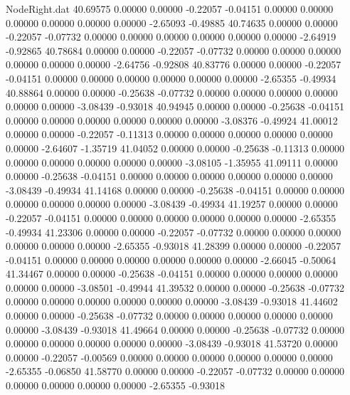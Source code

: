 \begin{filecontents}{NodeRight.dat}
  40.69575    0.00000    0.00000    -0.22057   -0.04151    0.00000    0.00000    0.00000    0.00000    0.00000    0.00000   -2.65093   -0.49885
  40.74635    0.00000    0.00000    -0.22057   -0.07732    0.00000    0.00000    0.00000    0.00000    0.00000    0.00000   -2.64919   -0.92865
  40.78684    0.00000    0.00000    -0.22057   -0.07732    0.00000    0.00000    0.00000    0.00000    0.00000    0.00000   -2.64756   -0.92808
  40.83776    0.00000    0.00000    -0.22057   -0.04151    0.00000    0.00000    0.00000    0.00000    0.00000    0.00000   -2.65355   -0.49934
  40.88864    0.00000    0.00000    -0.25638   -0.07732    0.00000    0.00000    0.00000    0.00000    0.00000    0.00000   -3.08439   -0.93018
  40.94945    0.00000    0.00000    -0.25638   -0.04151    0.00000    0.00000    0.00000    0.00000    0.00000    0.00000   -3.08376   -0.49924
  41.00012    0.00000    0.00000    -0.22057   -0.11313    0.00000    0.00000    0.00000    0.00000    0.00000    0.00000   -2.64607   -1.35719
  41.04052    0.00000    0.00000    -0.25638   -0.11313    0.00000    0.00000    0.00000    0.00000    0.00000    0.00000   -3.08105   -1.35955
  41.09111    0.00000    0.00000    -0.25638   -0.04151    0.00000    0.00000    0.00000    0.00000    0.00000    0.00000   -3.08439   -0.49934
  41.14168    0.00000    0.00000    -0.25638   -0.04151    0.00000    0.00000    0.00000    0.00000    0.00000    0.00000   -3.08439   -0.49934
  41.19257    0.00000    0.00000    -0.22057   -0.04151    0.00000    0.00000    0.00000    0.00000    0.00000    0.00000   -2.65355   -0.49934
  41.23306    0.00000    0.00000    -0.22057   -0.07732    0.00000    0.00000    0.00000    0.00000    0.00000    0.00000   -2.65355   -0.93018
  41.28399    0.00000    0.00000    -0.22057   -0.04151    0.00000    0.00000    0.00000    0.00000    0.00000    0.00000   -2.66045   -0.50064
  41.34467    0.00000    0.00000    -0.25638   -0.04151    0.00000    0.00000    0.00000    0.00000    0.00000    0.00000   -3.08501   -0.49944
  41.39532    0.00000    0.00000    -0.25638   -0.07732    0.00000    0.00000    0.00000    0.00000    0.00000    0.00000   -3.08439   -0.93018
  41.44602    0.00000    0.00000    -0.25638   -0.07732    0.00000    0.00000    0.00000    0.00000    0.00000    0.00000   -3.08439   -0.93018
  41.49664    0.00000    0.00000    -0.25638   -0.07732    0.00000    0.00000    0.00000    0.00000    0.00000    0.00000   -3.08439   -0.93018
  41.53720    0.00000    0.00000    -0.22057   -0.00569    0.00000    0.00000    0.00000    0.00000    0.00000    0.00000   -2.65355   -0.06850
  41.58770    0.00000    0.00000    -0.22057   -0.07732    0.00000    0.00000    0.00000    0.00000    0.00000    0.00000   -2.65355   -0.93018

\end{filecontents}
